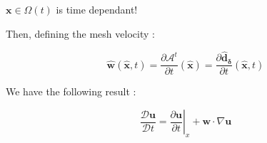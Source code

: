 \begin{frame}

\begin{alertblock}{}
$\mathbf{x} \in \Omega(t)$ is time dependant!
\end{alertblock}

Then, defining the mesh velocity :

$$\mathbf{\widehat{w}}( \mathbf{\widehat{x}}, t) = \dfrac{\partial \mathcal{A}^t}{\partial t}(\mathbf{\widehat{x}}) = \dfrac{\partial \mathbf{\widehat{d}_{\delta}}}{\partial t}(\mathbf{\widehat{x}},t)$$

We have the following result :

\begin{block}{}
$$\dfrac{\mathcal{D}\mathbf{u}}{\mathcal{D}t} = \left.\frac{\partial \mathbf{u}}{\partial t}\right|_x + \mathbf{w}\cdot \nabla \mathbf{u}$$
\end{block}






\end{frame}








